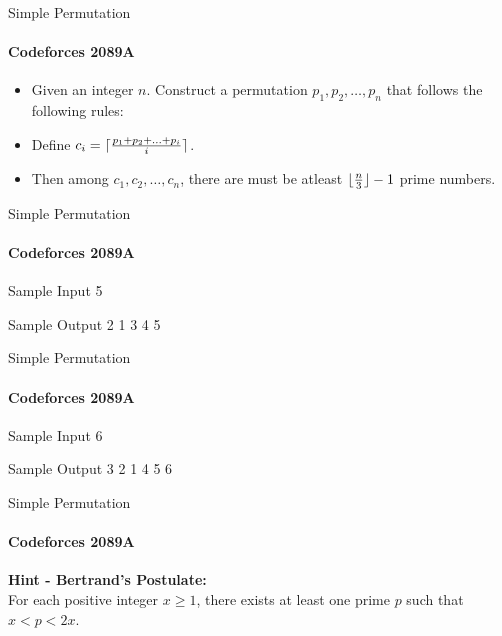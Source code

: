 

\begin{frame}{Simple Permutation}
	\framesubtitle{Codeforces 2089A}
	\begin{itemize}
		\item<1-> Given an integer $n$. Construct a permutation $p_1, p_2, \ldots, p_n$ that follows the following rules:
		\item<2-> Define $c_i = \ceil{\frac{p_1 + p_2 + \ldots + p_i}{i}}$.
		\item<3-> Then among $c_1, c_2, \ldots, c_n$, there are must be atleast $\floor{\frac{n}{3}} - 1$ prime numbers.
	\end{itemize}
\end{frame}

\begin{frame}{Simple Permutation}
	\framesubtitle{Codeforces 2089A}
	\begin{block}{Sample Input}
		5 \\
	\end{block}
	\begin{block}{Sample Output}
		2 1 3 4 5
	\end{block}
\end{frame}

\begin{frame}{Simple Permutation}
	\framesubtitle{Codeforces 2089A}
	\begin{block}{Sample Input}
		6 \\
	\end{block}
	\begin{block}{Sample Output}
		3 2 1 4 5 6
	\end{block}
\end{frame}

\begin{frame}{Simple Permutation}
	\framesubtitle{Codeforces 2089A}
	\textbf{Hint - Bertrand's Postulate:} \\
	For each positive integer $x \geq 1$, there exists at least one prime $p$ such that $x < p < 2x$.
\end{frame}

